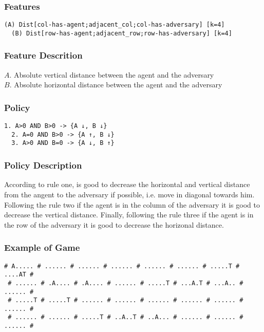 \documentclass[a4paper]{article}
\begin{document}
\subsubsection{Features}
\begin{Verbatim}[fontsize=\footnotesize]
  (A) Dist[col-has-agent;adjacent_col;col-has-adversary] [k=4]
  (B) Dist[row-has-agent;adjacent_row;row-has-adversary] [k=4]
\end{Verbatim}

\subsubsection{Feature Descrition}
$A$. Absolute vertical distance between the agent and the adversary\\
$B$. Absolute horizontal distance between the agent and the adversary
\subsubsection{Policy}

\begin{Verbatim}[fontsize=\footnotesize]
  1. A>0 AND B>0 -> {A ↓, B ↓}
  2. A=0 AND B>0 -> {A ↑, B ↓}
  3. A>0 AND B=0 -> {A ↓, B ↑}
\end{Verbatim}

\subsubsection{Policy Description}
According to rule one, is good to decrease the horizontal and vertical distance from the angent to the adversary if possible, i.e. move in diagonal towards him. Following the rule two if the agent is in the column of the adversary it is good to decrease the vertical distance. Finally, following the rule three if the agent is in the row of the adversary it is good to decrease the horizonal distance.

\subsubsection{Example of Game}
\begin{Verbatim}[fontsize=\footnotesize]
 # A..... # ...... # ...... # ...... # ...... # ...... # .....T # ....AT #
 # ...... # .A.... # .A.... # ...... # .....T # ...A.T # ...A.. # ...... #
 # .....T # .....T # ...... # ...... # ...... # ...... # ...... # ...... #
 # ...... # ...... # .....T # ..A..T # ..A... # ...... # ...... # ...... #
\end{Verbatim}
\end{document}
